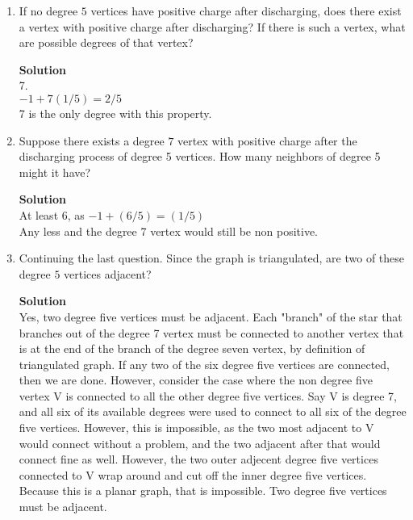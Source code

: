 \documentclass[11pt]{article}
\newenvironment{Parts}{\begin{enumerate}[label=(\alph*)]}{\end{enumerate}}
\newcommand*{\Part}{\item}
\begin{document}
\begin{Parts}
\Part If no degree $5$ vertices have positive charge after discharging, 
does there exist a vertex with positive charge after discharging?
If there is such a vertex, what are possible degrees of that vertex?

\begin{mdframed} \textbf{Solution} \\
7. \\
$-1+7(1/5)=2/5$\\
7 is the only degree with this property.
\end{mdframed}

\Part 
Suppose there exists a degree $7$ vertex with positive charge after the discharging process of degree 5 vertices.
How many neighbors of degree 5 might it have?
\begin{mdframed} \textbf{Solution} \\
At least 6, as $-1+(6/5)=(1/5)$ \\
Any less and the degree 7 vertex would still be non positive. 
\end{mdframed}

\Part Continuing the last question. Since the graph is triangulated,
  are two of these degree $5$ vertices adjacent?

\begin{mdframed} \textbf{Solution} \\
Yes, two degree five vertices must be adjacent. Each "branch" of the star that branches out of the degree 7 vertex must be connected to another vertex that is at the end of the branch of the degree seven vertex, by definition of triangulated graph. If any two of the six degree five vertices are connected, then we are done. However, consider the case where the non degree five vertex V is connected to all the other degree five vertices. Say V is degree 7, and all six of its available degrees were used to connect to all six of the degree five vertices. However, this is impossible, as the two most adjacent to V would connect without a problem, and the two adjacent after that would connect fine as well. However, the two outer adjecent degree five vertices connected to V wrap around and cut off the inner degree five vertices. Because this is a planar graph, that is impossible. Two degree five vertices must be adjacent.  
\end{mdframed}

\pagebreak  


\end{Parts}
\end{document}

